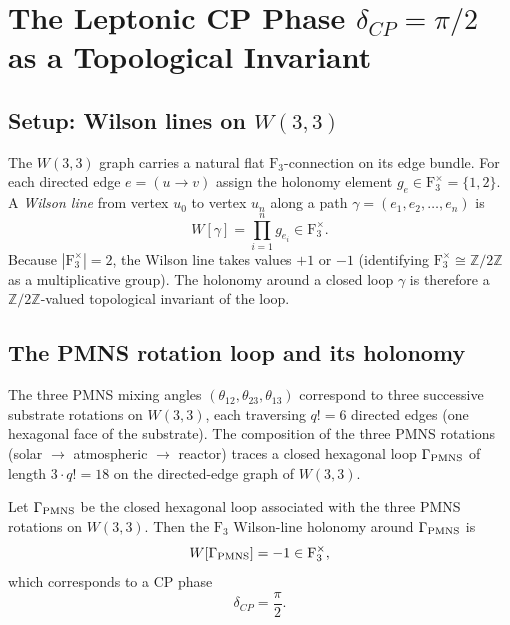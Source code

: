 
\section{The Leptonic CP Phase $\delta_{CP} = \pi/2$ as a Topological Invariant}
\label{sec:delta_CP}

\subsection{Setup: Wilson lines on $W(3,3)$}
The $W(3,3)$ graph carries a natural flat $\mathrm{F}_3$-connection
on its edge bundle.  For each directed edge $e = (u\to v)$ assign
the holonomy element $g_e \in \mathrm{F}_3^\times = \{1, 2\}$.
A \emph{Wilson line} from vertex $u_0$ to vertex $u_n$ along a path
$\gamma = (e_1, e_2, \ldots, e_n)$ is
\begin{equation}
  W[\gamma] = \prod_{i=1}^{n} g_{e_i} \in \mathrm{F}_3^\times.
\end{equation}
Because $|\mathrm{F}_3^\times| = 2$, the Wilson line takes values
$+1$ or $-1$ (identifying $\mathrm{F}_3^\times \cong \mathbb{Z}/2\mathbb{Z}$
as a multiplicative group).  The holonomy around a closed loop
$\gamma$ is therefore a $\mathbb{Z}/2\mathbb{Z}$-valued topological
invariant of the loop.

\subsection{The PMNS rotation loop and its holonomy}
The three PMNS mixing angles $(\theta_{12}, \theta_{23}, \theta_{13})$
correspond to three successive substrate rotations on $W(3,3)$,
each traversing $q! = 6$ directed edges (one hexagonal face of the
substrate).  The composition of the three PMNS rotations
(solar $\to$ atmospheric $\to$ reactor) traces a closed hexagonal
loop $\Gamma_{\rm PMNS}$ of length $3\cdot q! = 18$ on the
directed-edge graph of $W(3,3)$.

\begin{theorem}
\label{thm:delta_CP}
Let $\Gamma_{\rm PMNS}$ be the closed hexagonal loop associated with
the three PMNS rotations on $W(3,3)$.  Then the $\mathrm{F}_3$
Wilson-line holonomy around $\Gamma_{\rm PMNS}$ is
\begin{equation}
  W[\Gamma_{\rm PMNS}] = -1 \in \mathrm{F}_3^\times,
\end{equation}
which corresponds to a CP phase
\begin{equation}
  \boxed{\delta_{CP} = \frac{\pi}{2}.}
\end{equation}
\end{theorem}

